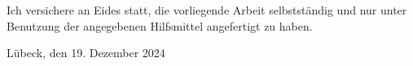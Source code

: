 \thispagestyle{plain}

\vspace*{7cm}
\noindent Ich versichere an Eides statt, die vorliegende Arbeit selbstständig und nur unter Benutzung der angegebenen Hilfsmittel angefertigt zu haben.

\vspace*{3cm}
\noindent Lübeck, den 19. Dezember 2024
\newpage
